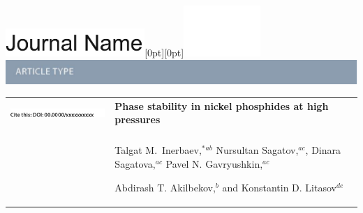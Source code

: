 \documentclass[twoside,twocolumn,9pt]{article}
\begin{document}
  \begin{@twocolumnfalse}
{\includegraphics[height=30pt]{head_foot/journal_name}\hfill\raisebox{0pt}[0pt][0pt]{\includegraphics[height=55pt]{head_foot/RSC_LOGO_CMYK}}\\[1ex]
\includegraphics[width=18.5cm]{head_foot/header_bar}}\par
\vspace{1em}
\sffamily
\begin{tabular}{m{4.5cm} p{13.5cm} }

\includegraphics{head_foot/DOI} & \noindent\LARGE{\textbf{Phase stability in nickel phosphides at high pressures %
}} \\%
\vspace{0.3cm} & \vspace{0.3cm} \\

 & \noindent\large{Talgat M.~Inerbaev,$^{\ast}$\textit{$^{ab}$} Nursultan Sagatov,\textit{$^{ac}$}, Dinara Sagatova,\textit{$^{ac}$} Pavel N.  Gavryushkin,\textit{$^{ac}$} 
 
 Abdirash T. Akilbekov,\textit{$^{b}$} and Konstantin D. Litasov\textit{$^{de}$}} \\%


\end{tabular}
\end{@twocolumnfalse}
\end{document}
